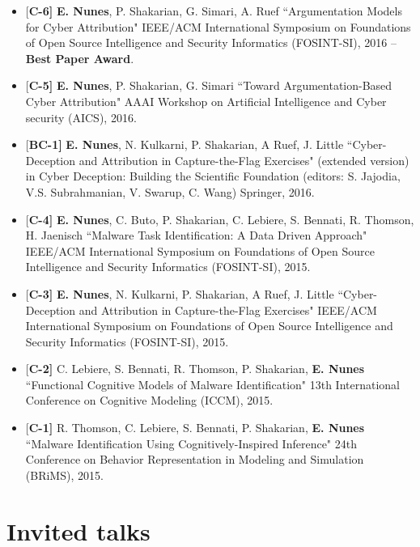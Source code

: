 \documentclass[margin,line]{CV}
\begin{document}
\begin{resume}
\begin{itemize}[leftmargin =*]
\item {[\bf C-6]} {\bf E. Nunes}, P. Shakarian, G. Simari, A. Ruef  ``Argumentation Models for Cyber Attribution"
IEEE/ACM International Symposium on Foundations of Open Source Intelligence and Security Informatics (FOSINT-SI), 2016 -- {\bf Best Paper Award}.

\item {[\bf C-5]} {\bf E. Nunes}, P. Shakarian, G. Simari ``Toward Argumentation-Based Cyber Attribution"
AAAI Workshop on Artificial Intelligence and Cyber security (AICS), 2016.

\item {[\bf BC-1]} {\bf E. Nunes}, N. Kulkarni, P. Shakarian, A Ruef, J. Little ``Cyber-Deception and Attribution in Capture-the-Flag Exercises" (extended version) in Cyber Deception: Building the Scientific Foundation (editors: S. Jajodia, V.S. Subrahmanian, V. Swarup, C. Wang) Springer, 2016.

\item {[\bf C-4]} {\bf E. Nunes}, C. Buto, P. Shakarian, C. Lebiere, S. Bennati, R. Thomson, H. Jaenisch ``Malware Task Identification: A Data Driven Approach"  IEEE/ACM International Symposium on Foundations of Open Source Intelligence and Security Informatics (FOSINT-SI), 2015.

\item {[\bf C-3]} {\bf E. Nunes},  N. Kulkarni, P. Shakarian, A Ruef, J. Little ``Cyber-Deception and Attribution in Capture-the-Flag Exercises"  IEEE/ACM International Symposium on Foundations of Open Source Intelligence and Security Informatics (FOSINT-SI), 2015.

\item {[\bf C-2]} C. Lebiere, S. Bennati, R. Thomson, P. Shakarian, {\bf E. Nunes}  ``Functional Cognitive Models of Malware Identification" 13th International Conference on Cognitive Modeling (ICCM), 2015.

\item {[\bf C-1]} R. Thomson, C. Lebiere, S. Bennati, P. Shakarian, {\bf E. Nunes}   ``Malware Identification Using Cognitively-Inspired Inference" 24th Conference on Behavior Representation in Modeling and Simulation (BRiMS), 2015.
   
\end{itemize}

\section{\sc Invited talks}
\begin{itemize}[leftmargin =*]


\end{itemize}
\end{resume}
\end{document}
